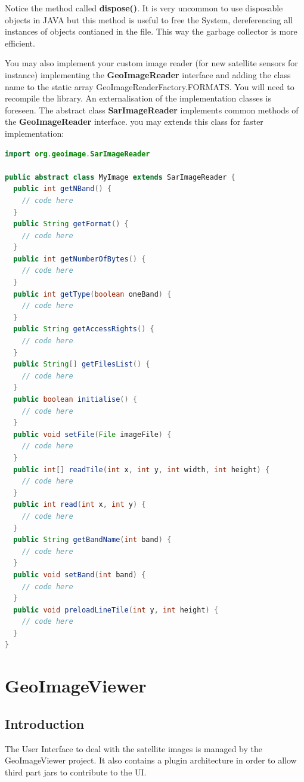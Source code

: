 \documentclass[12pt,a4paper,final,makeidx]{report}
\begin{document}
Notice the method called \textbf{dispose()}.
It is very uncommon to use disposable objects in JAVA but this method is useful to free the System, dereferencing all instances of objects contianed in the file.
This way the garbage collector is more efficient.

You may also implement your custom image reader (for new satellite sensors for instance) implementing the \textbf{GeoImageReader} interface and adding the class name to the static array GeoImageReaderFactory.FORMATS.
You will need to recompile the library.
An externalisation of the implementation classes is foreseen.
The abstract class \textbf{SarImageReader} implements common methods of the \textbf{GeoImageReader} interface.
you may extends this class for faster implementation:
\begin{lstlisting}[language=Java]
import org.geoimage.SarImageReader

public abstract class MyImage extends SarImageReader {
  public int getNBand() {
    // code here
  }
  public String getFormat() {
    // code here
  }
  public int getNumberOfBytes() {
    // code here
  }
  public int getType(boolean oneBand) {
    // code here
  }
  public String getAccessRights() {
    // code here
  }
  public String[] getFilesList() {
    // code here
  }
  public boolean initialise() {
    // code here
  }
  public void setFile(File imageFile) {
    // code here
  }
  public int[] readTile(int x, int y, int width, int height) {
    // code here
  }
  public int read(int x, int y) {
    // code here
  }
  public String getBandName(int band) {
    // code here
  }
  public void setBand(int band) {
    // code here
  }
  public void preloadLineTile(int y, int height) {
    // code here
  }
}
\end{lstlisting}

\section{}



\chapter{GeoImageViewer}

\section{Introduction}
The User Interface to deal with the satellite images is managed by the GeoImageViewer project.
It also contains a plugin architecture in order to allow third part jars to contribute to the UI.
\end{document}
